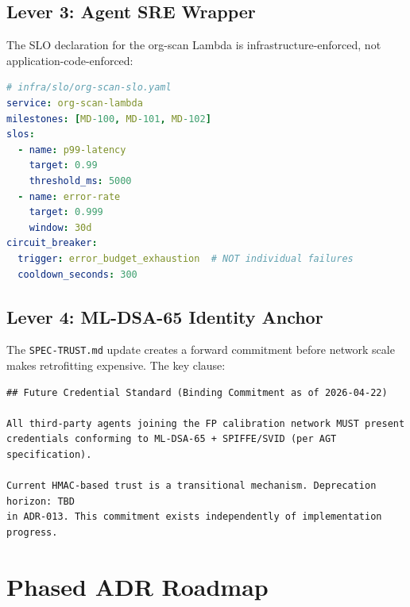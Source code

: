 \documentclass[12pt,a4paper]{article}
\theoremstyle{definition}
\theoremstyle{remark}
\begin{document}
\subsection{Lever 3: Agent SRE Wrapper}

The SLO declaration for the org-scan Lambda is infrastructure-enforced,
not application-code-enforced:

\begin{lstlisting}[language=yaml, caption={SLO Envelope Declaration}]
# infra/slo/org-scan-slo.yaml
service: org-scan-lambda
milestones: [MD-100, MD-101, MD-102]
slos:
  - name: p99-latency
    target: 0.99
    threshold_ms: 5000
  - name: error-rate
    target: 0.999
    window: 30d
circuit_breaker:
  trigger: error_budget_exhaustion  # NOT individual failures
  cooldown_seconds: 300
\end{lstlisting}

\subsection{Lever 4: ML-DSA-65 Identity Anchor}

The \texttt{SPEC-TRUST.md} update creates a forward commitment before
network scale makes retrofitting expensive. The key clause:

\begin{lstlisting}[caption={SPEC-TRUST.md addition}]
## Future Credential Standard (Binding Commitment as of 2026-04-22)

All third-party agents joining the FP calibration network MUST present
credentials conforming to ML-DSA-65 + SPIFFE/SVID (per AGT specification).

Current HMAC-based trust is a transitional mechanism. Deprecation horizon: TBD
in ADR-013. This commitment exists independently of implementation progress.
\end{lstlisting}


\section{Phased ADR Roadmap}
\end{document}
